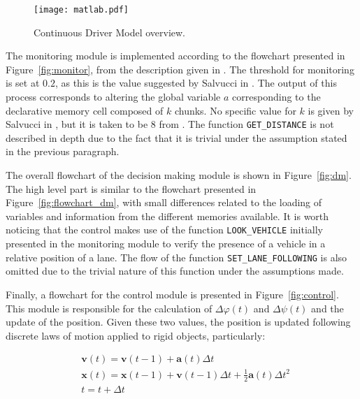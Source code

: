 \vspace{1em}
\begin{figure}[h]
    \centering
    \texttt{[image: matlab.pdf]}
    \caption{Continuous Driver Model overview.}
    \label{fig:driver_model_overview}
\end{figure}

The monitoring module is implemented according to the flowchart presented in Figure~\ref{fig:monitor}, from the description given in \cite{salvucci_1}. The threshold for monitoring is set at $0.2$, as this is the value suggested by Salvucci in \cite{salvucci_1}. The output of this process corresponds to altering the global variable $a$ corresponding to the declarative memory cell composed of $k$ chunks. No specific value for $k$ is given by Salvucci in \cite{salvucci_1}, but it is taken to be 8 from \cite{lam}. The function \texttt{GET\_DISTANCE} is not described in depth due to the fact that it is trivial under the assumption stated in the previous paragraph.

The overall flowchart of the decision making module is shown in Figure~\ref{fig:dm}. The high level part is similar to the flowchart presented in Figure~\ref{fig:flowchart_dm}, with small differences related to the loading of variables and information from the different memories available. It is worth noticing that the control makes use of the function \texttt{LOOK\_VEHICLE} initially presented in the monitoring module to verify the presence of a vehicle in a relative position of a lane. The flow of the function \texttt{SET\_LANE\_FOLLOWING} is also omitted due to the trivial nature of this function under the assumptions made.

Finally, a flowchart for the control module is presented in Figure~\ref{fig:control}. This module is responsible for the calculation of $\Delta\varphi(t)$ and $\Delta\psi(t)$ and the update of the position. Given these two values, the position is updated following discrete laws of motion applied to rigid objects, particularly:

\begin{equation}
\begin{aligned}
	& \mathbf{v}(t) = \mathbf{v}(t-1) + \mathbf{a}(t)\Delta t\\
	& \mathbf{x}(t) = \mathbf{x}(t-1) + \mathbf{v}(t-1)\Delta t + \frac{1}{2}  \mathbf{a}(t)\Delta t^2 \\
	& t = t + \Delta t
\end{aligned}
\end{equation}

